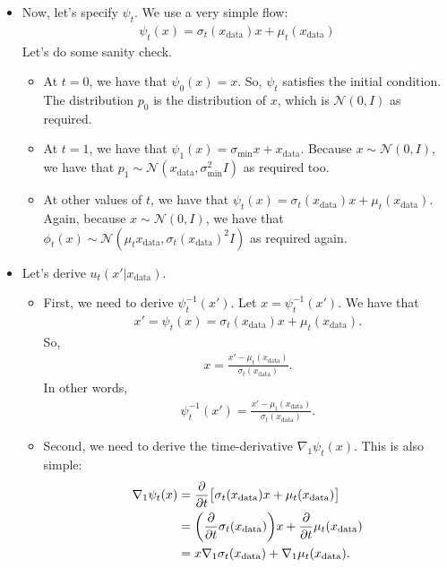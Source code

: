 \documentclass[10pt]{article}
\newcommand{\mcal}[1]{\mathcal{#1}}
\newcommand{\data}{\mathrm{data}}
\begin{document}
\begin{itemize}
  \item Now, let's specify $\psi_t$. We use a very simple flow:
  \begin{align*}
    \psi_t(x) = \sigma_t(x_{\data}) x + \mu_t(x_{\data})
  \end{align*}
  Let's do some sanity check.
  \begin{itemize}
    \item At $t = 0$, we have that $\psi_0(x) = x$. So, $\psi_t$ satisfies the initial condition. The distribution $p_0$ is the distribution of $x$, which is $\mcal{N}(0,I)$ as required.
    \item At $t = 1$, we have that $\psi_1(x) = \sigma_{\min} x + x_{\data}$. Because $x \sim \mcal{N}(0,I)$, we have that $p_1 \sim \mcal{N}(x_{\data}, \sigma_{\min}^2I)$ as required too.
    \item At other values of $t$, we have that $\psi_t(x) = \sigma_t(x_{\data}) x + \mu_t(x_{\data})$. Again, because $x \sim \mcal{N}(0,I)$, we have that $\phi_t(x) \sim \mcal{N}(\mu_t{x_{\data}},\sigma_t(x_{\data})^2 I)$ as required again.
  \end{itemize}

  \item Let's derive $u_t(x'|x_{\data})$.
  \begin{itemize}
    \item First, we need to derive $\psi^{-1}_t(x')$. Let $x = \psi^{-1}_t(x')$. We have that
    \begin{align*}
      x' = \psi_t(x) = \sigma_{t}(x_{\data}) x + \mu_t(x_{\data}).
    \end{align*}
    So,
    \begin{align*}
      x = \frac{x' - \mu_t(x_{\data})}{\sigma_t(x_{\data})}.
    \end{align*}
    In other words,
    \begin{align}
      \psi^{-1}_t(x') = \frac{x' - \mu_t(x_{\data})}{\sigma_t(x_{\data})}. \label{eqn:single-item-flow-inverse}
    \end{align}

    \item Second, we need to derive the time-derivative $\nabla_1 \psi_t(x)$. This is also simple:
    \begin{align}
      \nabla_1 \psi_t(x) 
      &= \frac{\partial}{\partial t} \big[ \sigma_t(x_{\data}) x + \mu_t(x_{\data}) \big] \notag \\
      &= \bigg( \frac{\partial}{\partial t} \sigma_t(x_{\data}) \bigg) x + \frac{\partial}{\partial t} \mu_t(x_{\data}) \notag \\
      &= x \nabla_1 \sigma_t(x_{\data}) + \nabla_1 \mu_t(x_{\data}). \label{eqn:single-item-time-deriv}
    \end{align}
  \end{itemize}


\end{itemize}
\end{document}
